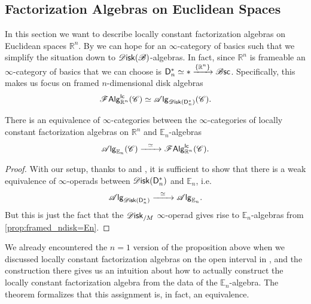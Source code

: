 \documentclass[../text]{subfiles}
\begin{document}
\subsection{Factorization Algebras on Euclidean Spaces}\label{ssec:lcfa_on_Rn}

In this section we want to describe locally constant factorization algebras on Euclidean spaces $\mathbb{R}^n$. By  we can hope for an $\infty$-category of basics such that we simplify the situation down to $\disk (\bstr)$-algebras. In fact, since $\mathbb{R}^n$ is frameable an $\infty$-category of basics that we can choose is $\mathsf{D}_n^* \simeq * \xrightarrow{\{ \mathbb{R}^n\}} \mathscr{B} \mathsf{sc}$. Specifically, this makes us focus on framed $n$-dimensional disk algebras
%
\begin{equation}
    \lcfa_{\mathbb{R}^n} (\catC) \simeq \alg{\disk (\mathsf{D}_n^*)} (\catC).
\end{equation}
%

\begin{theorem}
    There is an equivalence of $\infty$-categories between the $\infty$-categories of locally constant factorization algebras on $\mathbb{R}^n$ and $\mathbb{E}_n$-algebras
    \begin{equation}
        \alg{\mathbb{E}_n} (\catC) \xrightarrow{\ \ \simeq \ \ } \lcfa_{\mathbb{R}^n} (\catC).
    \end{equation}
\end{theorem}

\begin{proof}
    With our setup, thanks to  and , it is sufficient to show that there is a weak equivalence of $\infty$-operads between $\disk (\mathsf{D}_n^*)$ and $\mathbb{E}_n$, i.e.
    \begin{equation}
        \alg{\disk (\mathsf{D}_n^*)} \xrightarrow{\ \ \simeq \ \ } \alg{\mathbb{E}_n}.
    \end{equation}
    But this is just the fact that the $\disk_{/M}$ $\infty$-operad gives rise to $\mathbb{E}_n$-algebras from \cref{prop:framed_ndisk=En}.
\end{proof}

\begin{remark}
    We already encountered the $n=1$ version of the proposition above when we discussed locally constant factorization algebras on the open interval in , and the construction there gives us an intuition about how to actually construct the locally constant factorization algebra from the data of the $\mathbb{E}_n$-algebra. The theorem formalizes that this assignment is, in fact, an equivalence.
\end{remark}
\end{document}
